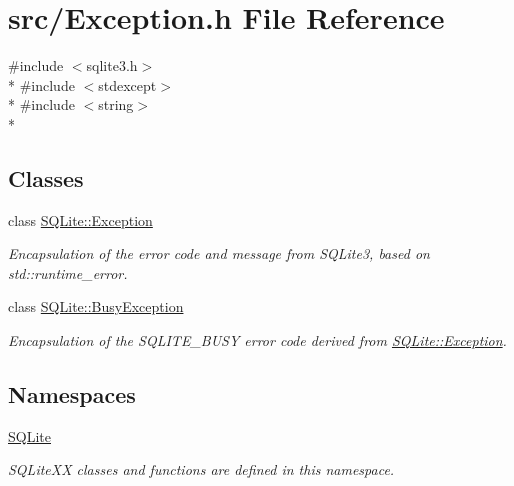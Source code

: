 \hypertarget{a00024}{\section{src/\-Exception.h File Reference}
\label{a00024}
}
{\ttfamily \#include $<$sqlite3.\-h$>$}\\*
{\ttfamily \#include $<$stdexcept$>$}\\*
{\ttfamily \#include $<$string$>$}\\*
\subsection*{Classes}
\begin{DoxyCompactItemize}
\item 
class \hyperlink{a00006}{S\-Q\-Lite\-::\-Exception}
\begin{DoxyCompactList}\small\item\em Encapsulation of the error code and message from S\-Q\-Lite3, based on std\-::runtime\-\_\-error. \end{DoxyCompactList}\item 
class \hyperlink{a00003}{S\-Q\-Lite\-::\-Busy\-Exception}
\begin{DoxyCompactList}\small\item\em Encapsulation of the S\-Q\-L\-I\-T\-E\-\_\-\-B\-U\-S\-Y error code derived from \hyperlink{a00006}{S\-Q\-Lite\-::\-Exception}. \end{DoxyCompactList}\end{DoxyCompactItemize}
\subsection*{Namespaces}
\begin{DoxyCompactItemize}
\item 
\hyperlink{a00038}{S\-Q\-Lite}
\begin{DoxyCompactList}\small\item\em S\-Q\-Lite\-X\-X classes and functions are defined in this namespace. \end{DoxyCompactList}\end{DoxyCompactItemize}
